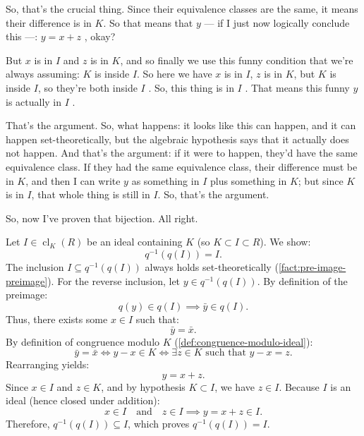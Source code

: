 \begin{proofWrapper}
\begin{speech}[00:34:49 - 00:36:36]
So, that's the crucial thing. Since their equivalence classes are the same, it means their difference is in $K$. So that means that $y$ --- if I just now logically conclude this ---: $y = x + z$ , okay?

But $x$ is in $I$ and $z$ is in $K$, and so finally we use this funny condition that we're always assuming: $K$ is inside $I$. So here we have $x$ is in $I$, $z$ is in $K$, but $K$ is inside $I$, so they're both inside $I$ . So, this thing is in $I$ . That means this funny $y$ is actually in $I$ .

That's the argument. So, what happens: it looks like this can happen, and it can happen set-theoretically, but the algebraic hypothesis says that it actually does not happen. And that's the argument: if it were to happen, they'd have the same equivalence class. If they had the same equivalence class, their difference must be in $K$, and then I can write $y$ as something in $I$ plus something in $K$; but since $K$ is in $I$, that whole thing is still in $I$. So, that's the argument.

So, now I've proven that bijection. All right.
\end{speech}

\begin{content}[Bijective Property Part (B): \texorpdfstring{$q^{-1}(q(I)) = I$}{q^{-1}(q(I)) = I}]
Let $I \in \operatorname{cl}_K(R)$ be an ideal containing $K$ (so $K \subset I \subset R$). We show:
\begin{equation}\label{eq:composition-step-b}
q^{-1}(q(I)) = I.
\end{equation}
The inclusion $I \subseteq q^{-1}(q(I))$ always holds set-theoretically (\cref{fact:pre-image-preimage}).
For the reverse inclusion, let $y \in q^{-1}(q(I))$.
By definition of the preimage:
\[
q(y) \in q(I) \implies \bar{y} \in q(I).
\]
Thus, there exists some $x \in I$ such that:
\[
\bar{y} = \bar{x}.
\]
By definition of congruence modulo $K$ (\cref{def:congruence-modulo-ideal}):
\[
\bar{y} = \bar{x} \iff y - x \in K \iff \exists z \in K \text{ such that } y - x = z.
\]
Rearranging yields:
\[
y = x + z.
\]
Since $x \in I$ and $z \in K$, and by hypothesis $K \subset I$, we have $z \in I$. Because $I$ is an ideal (hence closed under addition):
\[
x \in I \quad \text{and} \quad z \in I \implies y = x + z \in I.
\]
Therefore, $q^{-1}(q(I)) \subseteq I$, which proves $q^{-1}(q(I)) = I$.


\end{content}
\end{proofWrapper}
